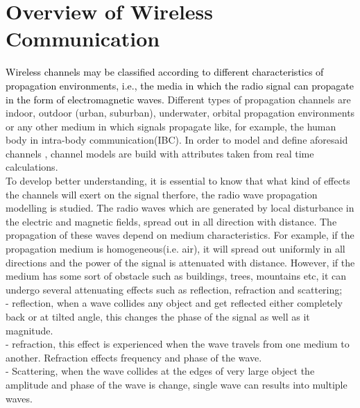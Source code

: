 \chapter{Overview of Wireless Communication}
\textcolor{black}{Wireless channels may be classified according to different  characteristics of propagation environments, i.e., the media in which the radio signal can propagate in the form of electromagnetic waves.} Different types of propagation channels are indoor, outdoor (urban, suburban), underwater, orbital propagation environments or any other medium in which signals propagate like, for example, the human body in intra-body communication(IBC).
In order to model  and define aforesaid channels , channel models are build with attributes taken from real time calculations. \\
To develop better understanding, it is essential to know that what kind of effects the channels will exert on the signal therfore, the radio wave propagation modelling is studied.
The radio waves which are generated by local disturbance in the electric and magnetic fields, spread out in all direction with distance. 
The propagation of these waves depend on medium characteristics. For example, if the propagation medium is homogeneous(i.e.  air), it will spread out uniformly in all directions and the power of the signal is attenuated with distance. However, if the medium has some sort of obstacle such as buildings, trees, mountains etc, it can undergo several attenuating effects such as reflection, refraction and scattering;  \\
-	reflection, when a wave collides any object and get reflected either completely back or at tilted angle, this changes the phase of the signal as well as it magnitude. \\
-	refraction, this effect is experienced when the wave travels from one medium to another. Refraction effects frequency and phase of the wave.\\
-	Scattering, when the wave collides at the edges of very large object the amplitude and phase of the wave is change, single wave can results into multiple waves. 


